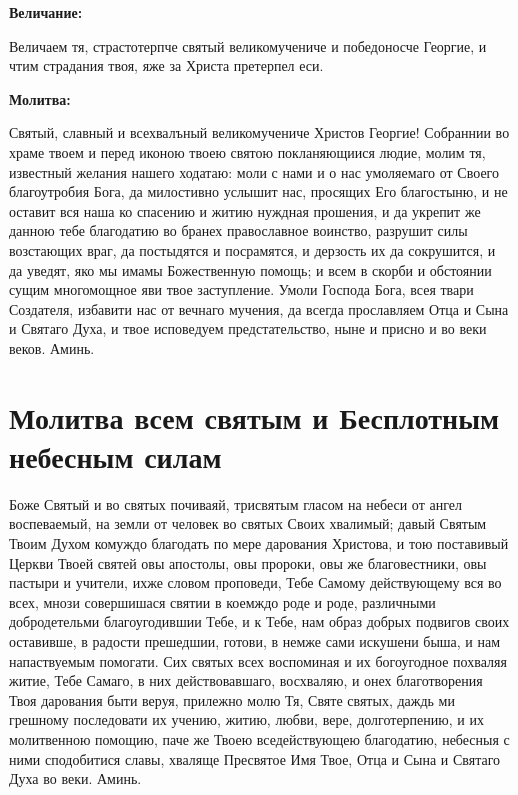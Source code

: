\medskip
\bfseries Величание:\normalfont{}


Величаем тя, страстотерпче святый великомучениче и победоносче Георгие, и чтим страдания твоя, яже за Христа претерпел еси.


\medskip
\bfseries Молитва:\normalfont{}


Святый, славный и всехвалъный великомучениче Христов Георгие! Собраннии во храме твоем и перед иконою твоею святою покланяющиися людие, молим тя, известный желания нашего ходатаю: моли с нами и о нас умоляемаго от Своего благоутробия Бога, да милостивно услышит нас, просящих Его благостыню, и не оставит вся наша ко спасению и житию нуждная прошения, и да укрепит же данною тебе благодатию во бранех православное воинство, разрушит силы возстающих враг, да постыдятся и посрамятся, и дерзость их да сокрушится, и да уведят, яко мы имамы Божественную помощь; и всем в скорби и обстоянии сущим многомощное яви твое заступление. Умоли Господа Бога, всея твари Создателя, избавити нас от вечнаго мучения, да всегда прославляем Отца и Сына и Святаго Духа, и твое исповедуем предстательство, ныне и присно и во веки веков. Аминь.

\bigskip\bigskip\mychapterending


 

\section{Молитва всем святым и Бесплотным небесным силам}
 


Боже Святый и во святых почиваяй, трисвятым гласом на небеси от ангел воспеваемый, на земли от человек во святых Своих хвалимый; давый Святым Твоим Духом комуждо благодать по мере дарования Христова, и тою поставивый Церкви Твоей святей овы апостолы, овы пророки, овы же благовестники, овы пастыри и учители, ихже словом проповеди, Тебе Самому действующему вся во всех, мнози совершишася святии в коемждо роде и роде, различными добродетельми благоугодившии Тебе, и к Тебе, нам образ добрых подвигов своих оставивше, в радости прешедшии, готови, в немже сами искушени быша, и нам напаствуемым помогати. Сих святых всех воспоминая и их богоугодное похваляя житие, Тебе Самаго, в них действовавшаго, восхваляю, и онех благотворения Твоя дарования быти веруя, прилежно молю Тя, Святе святых, даждь ми грешному последовати их учению, житию, любви, вере, долготерпению, и их молитвенною помощию, паче же Твоею вседействующею благодатию, небесныя с ними сподобитися славы, хваляще Пресвятое Имя Твое, Отца и Сына и Святаго Духа во веки. Аминь.

